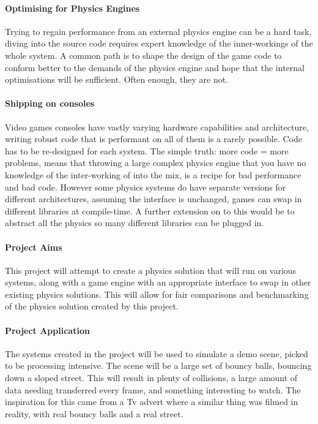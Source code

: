 \documentclass[conference]{acmsiggraph}
\begin{document}
\paragraph{Optimising for Physics Engines}
Trying to regain performance from an external physics engine can be a hard task, diving into the source code requires expert knowledge of the inner-workings of the whole system. A common path is to shape the design of the game code to conform better to the demands of the physics engine and hope that the internal optimisations  will be sufficient. Often enough, they are not.

\paragraph{Shipping on consoles}
Video games consoles have vastly varying hardware capabilities and architecture, writing robust code that is performant on all of them is a rarely possible. Code has to be re-designed for each system. The simple truth: more code = more problems, means that throwing a large complex physics engine that you have no knowledge of the inter-working of into the mix, is a recipe for bad performance and bad code. However some physics systems do have separate versions for different architectures, assuming the interface is unchanged, games can swap in different libraries at compile-time. A further extension on to this would be to abstract all the physics so many different libraries can be plugged in.

\paragraph{Project Aims}
This project will attempt to create a physics solution that will run on various systems, along with a game engine with an appropriate interface to swap in other existing physics solutions. This will allow for fair comparisons and benchmarking of the physics solution created by this project.

\paragraph{Project Application}
The systems created in the project will be used to simulate a demo scene, picked to be processing intensive. The scene will be a large set of bouncy balls, bouncing down a sloped street. This will result in plenty of collisions, a large amount of data needing transferred every frame, and something interesting to watch. The inspiration for this came from a Tv advert \cite{advert} where a similar thing was filmed in reality, with real bouncy balls and a real street.
\end{document}
